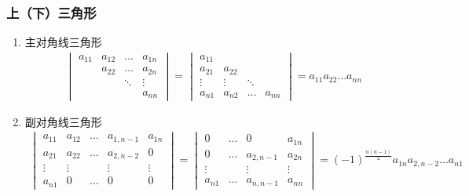 \documentclass[a4paper,12pt]{article}
\begin{document}
    \subsubsection{上（下）三角形}

    \begin{enumerate}
        \item 主对角线三角形
        \begin{align*}
            \begin{vmatrix}
                a_{11} & a_{12} & \dots  & a_{1n} \\
                & a_{22} & \dots  & a_{2n} \\
                &        & \ddots & \vdots \\
                &        &        & a_{nn}
            \end{vmatrix}
            = \begin{vmatrix}
                  a_{11} &        &        &        \\
                  a_{21} & a_{22} &        &        \\
                  \vdots & \vdots & \ddots &        \\
                  a_{n1} & a_{n2} & \dots  & a_{nn}
            \end{vmatrix}
            = a_{11}a_{22}\dots a_{nn}
        \end{align*}
        \item 副对角线三角形
        \begin{align*}
            \begin{vmatrix}
                a_{11} & a_{12} & \dots & a_{1,n-1} & a_{1n} \\
                a_{21} & a_{22} & \dots & a_{2,n-2} & 0      \\
                \vdots & \vdots &       & \vdots    & \vdots \\
                a_{n1} & 0      & \dots & 0         & 0
            \end{vmatrix}
            = \begin{vmatrix}
                  0      & \dots & 0         & a_{1n} \\
                  0      & \dots & a_{2,n-1} & a_{2n} \\
                  \vdots &       & \vdots    & \vdots \\
                  a_{n1} & \dots & a_{n,n-1} & a_{nn}
            \end{vmatrix}
            = (-1)^{\frac{n(n-1)}{2}}a_{1n}a_{2,n-2}\dots a_{n1}
        \end{align*}
    \end{enumerate}
\end{document}
